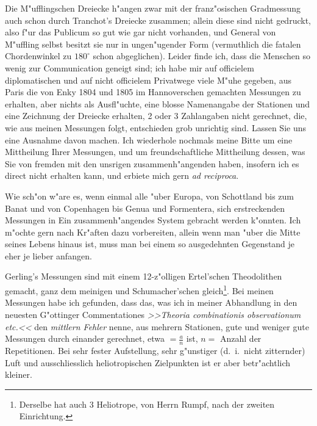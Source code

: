 \documentclass[12pt,a4paper]{article}
\theoremstyle{plain}
\theoremstyle{definition}
\theoremstyle{remark}
\begin{document}
\newpage
\noindent Die M"ufflingschen Dreiecke h"angen zwar mit der franz"osischen Gradmessung auch schon durch Tranchot's Dreiecke zusammen; allein diese sind nicht gedruckt, also f"ur das Publicum so gut wie gar nicht vorhanden, und General von M"uffling selbst besitzt sie nur in ungen"ugender Form (vermuthlich die fatalen Chordenwinkel zu $180^{\circ}$ schon abgeglichen). Leider finde ich, dass die Menschen so wenig zur Communication geneigt sind; ich habe mir auf officielem diplomatischen und auf nicht officielem Privatwege viele M"uhe gegeben, aus Paris die von Enky 1804 und 1805 im Hannoverschen gemachten Messungen zu erhalten, aber nichts als Ausfl"uchte, eine blosse Namenangabe der Stationen und eine Zeichnung der Dreiecke erhalten, 2 oder 3 Zahlangaben nicht gerechnet, die, wie aus meinen Messungen folgt, entschieden grob unrichtig sind. Lassen Sie uns eine Ausnahme davon machen. Ich wiederhole nochmals meine Bitte um eine Mittheilung Ihrer Messungen, und um freundschaftliche Mittheilung dessen, was Sie von fremden mit den unsrigen zusammenh"angenden haben, insofern ich es direct nicht erhalten kann, und erbiete mich gern \emph{ad reciproca}.

Wie sch"on w"are es, wenn einmal alle "uber Europa, von Schottland bis zum Banat und von Copenhagen bis Genua und Formentera, sich erstreckenden Messungen in Ein zusammenh"angendes System gebracht werden k"onnten. Ich m"ochte gern nach Kr"aften dazu vorbereiten, allein wenn man "uber die Mitte seines Lebens hinaus ist, muss man bei einem so ausgedehnten Gegenstand je eher je lieber anfangen.

Gerling's Messungen sind mit einem 12-z"olligen Ertel'schen Theodolithen gemacht, ganz dem meinigen und Schumacher'schen gleich\footnote{Derselbe hat auch 3 Heliotrope, von Herrn Rumpf, nach der zweiten Einrichtung.}. Bei meinen Messungen habe ich gefunden, dass das, was ich in meiner Abhandlung in den neuesten G"ottinger Commentationes \emph{>>Theoria combinationis observationum etc.<<} den \emph{mittlern Fehler} nenne, aus mehrern Stationen, gute und weniger gute Messungen durch einander gerechnet, etwa $= \frac{a}{n}$ ist, $n =$ Anzahl der Repetitionen. Bei sehr fester Aufstellung, sehr g"unstiger (d.\ i.\ nicht zitternder) Luft und ausschliesslich heliotropischen Zielpunkten ist er aber betr"achtlich kleiner.
\end{document}
